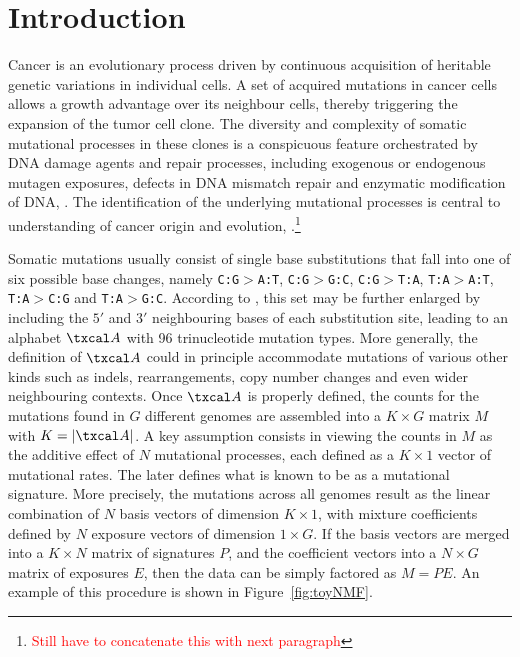 \documentclass{bioinfo}
\begin{document}
\section{Introduction}
Cancer is an evolutionary process driven by continuous acquisition of
heritable genetic variations in individual cells. A set of acquired
mutations in cancer cells allows a growth advantage over its neighbour
cells, thereby triggering the expansion of the tumor cell clone. The
diversity and complexity of somatic mutational processes in these
clones is a conspicuous feature orchestrated by DNA damage agents and
repair processes, including exogenous or endogenous mutagen exposures,
defects in DNA mismatch repair and enzymatic modification of DNA,
\cite{RG}. The identification of the underlying mutational
processes is central to understanding of cancer origin and evolution,
\citealp{RG, AS, HEN}.\footnote{\textcolor{red}{Still have to
    concatenate this with next paragraph}}


Somatic mutations usually consist of single base substitutions that
fall into one of six possible base changes, namely
\texttt{C:G}$>$\texttt{A:T}, \texttt{C:G}$>$\texttt{G:C},
\texttt{C:G}$>$\texttt{T:A}, \texttt{T:A}$>$\texttt{A:T},
\texttt{T:A}$>$\texttt{C:G} and \texttt{T:A}$>$\texttt{G:C}. According
to \cite{A}, this set may be further enlarged by including the $5'$
and $3'$ neighbouring bases of each substitution site, leading to an 
alphabet $\txcal A$ with 96 trinucleotide mutation types. More
generally, the definition of $\txcal A$ could in principle accommodate
mutations of various other kinds such as indels, rearrangements, copy
number changes and even wider neighbouring contexts. Once $\txcal A$
is properly defined, the counts for the mutations found in $G$
different genomes are assembled into a $K\times G$ matrix $M$ with $K
= |\txcal A|$. A key assumption consists in viewing the counts in $M$
as the additive effect of $N$ mutational processes, each defined as a
$K\times 1$ vector of mutational rates. The later defines what
is known to be as a mutational signature. More precisely, the
mutations across all genomes result as the linear combination of $N$
basis vectors of dimension $K\times 1$, with mixture coefficients
defined by $N$ exposure vectors of dimension $1 \times G$. If the
basis vectors are merged into a $K\times N$ matrix of signatures $P$,
and the coefficient vectors into a $N\times G$ matrix of exposures
$E$, then the data can be simply factored as $M=PE$. An example of
this procedure is shown in Figure~\ref{fig:toyNMF}.
\end{document}
